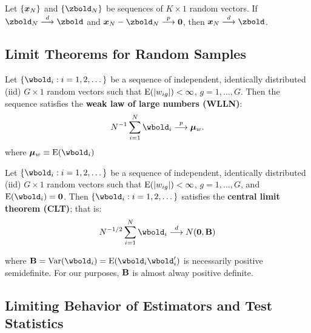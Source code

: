 \documentclass[11pt, oneside, a4paper, article]{article}
\numberwithin{equation}{section}
\begin{document}
\begin{lem}
	Let $\{\boldsymbol{x}_{N}\}$ and $\seq{\zbold_{N}}$ be sequences of $K \times 1$ random vectors.
	If $\zbold_{N} \arrowd \zbold$ and $\xvec_{N} - \zbold_{N} \arrowp \mbs{0}$, then
	$\xvec_{N} \arrowd \zbold$.
\end{lem}

\subsection{Limit Theorems for Random Samples}

\begin{teo}
Let $\seq{\wbold_{i}:i=1,2,\dots}$ be a sequence of independent, identically distributed (iid) $G \times 1$ random vectors such that
$\text{E}( | w_{ig} | ) < \infty$, $g=1,\dots, G$.
Then the sequence satisfies the \textbf{weak law of large numbers (WLLN)}:
	\begin{equation*}
		N^{-1} \sum_{i=1}^{N} \wbold_{i} \arrowp \mubold_{w}.
	\end{equation*}
where $\mubold_{w} \equiv \E(\wbold_{i})$
\end{teo}

\begin{teo}
Let $\seq{\wbold_{i}:i=1,2,\dots}$ be a sequence of independent, identically distributed (iid) $G \times 1$ random vectors such that
$\text{E}( | w_{ig} | ) < \infty$, $g=1,\dots, G$, and
$\E(\wbold_{i}) = \mbs{0}$.
Then $\seq{\wbold_{i}:i=1,2,\dots}$ satisfies the \textbf{central limit theorem (CLT)}; that is:
	\begin{equation*}
		N^{-1/2} \sum_{i=1}^{N} \wbold_{i} \arrowd N(\mbs{0}, \Bbold)
	\end{equation*}
\end{teo}
where $\Bbold = \Var(\wbold_{i}) = \E(\wbold_{i} \wbold_{i}')$
is necessarily positive semidefinite.
For our purposes, $\mathbf{B}$ is almost alway positive definite.

\subsection{Limiting Behavior of Estimators and Test Statistics}
\end{document}
